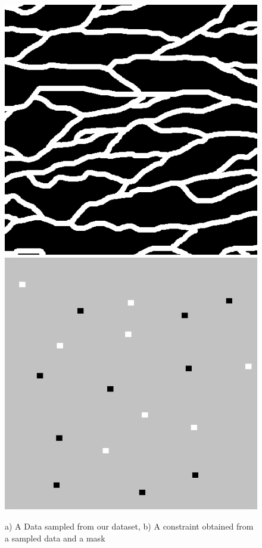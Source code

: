 \documentclass{article}
\begin{document}
		\begin{figure}
			\center
			\includegraphics[scale=0.3]{channels}
			\includegraphics[scale=0.25]{cons}
			\caption{a) A Data sampled from our dataset, b) A constraint obtained from a sampled data and a mask}
			\label{channels}
		\end{figure}
	
\end{document}
